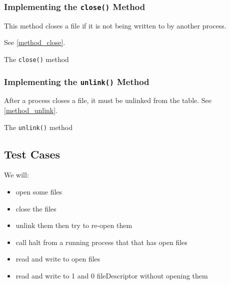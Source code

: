 \documentclass[12pt, letterpaper]{report}
\newcommand{\code}[1]{\texttt{#1}}
\begin{document}
\subsubsection*{Implementing the \code{close()} Method}
This method closes a file if it is not being written to by another process.

See \vref{method_close}.

\begin{algorithm}[!ht]
  \caption{The \code{close()} method}
  \label{method_close}
  \SetAlgoLined
  \BlankLine
\end{algorithm}


\subsubsection*{Implementing the \code{unlink()} Method}
After a process closes a file, it must be unlinked from the table.
See \vref{method_unlink}.

\begin{algorithm}[!ht]
  \caption{The \code{unlink()} method}
  \label{method_unlink}
  \SetAlgoLined
  \BlankLine
\end{algorithm}


\subsection*{Test Cases}
We will:
\begin{itemize}
\item open some files
\item close the files
\item unlink them then try to re-open them
\item call halt from a running process that that has open files
\item read and write to open files
\item read and write to 1 and 0 fileDescriptor without opening them
\end{itemize}
\clearpage
\end{document}
